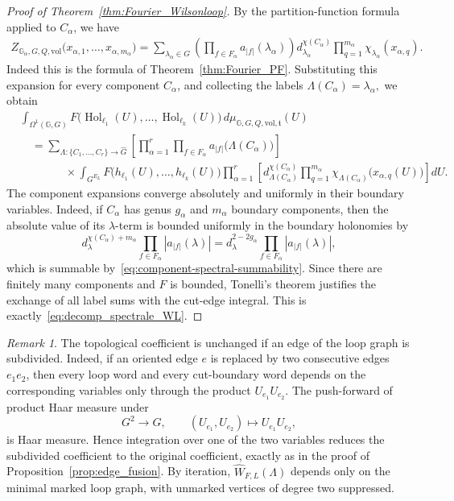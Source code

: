 \documentclass[11pt,a4paper,reqno]{article}
\theoremstyle{definition}
\theoremstyle{remark}
\newtheorem{remark}[theorem]{Remark}
\begin{document}
\begin{proof}[Proof of Theorem~\ref{thm:Fourier_Wilsonloop}]
By the partition-function formula applied to $C_\alpha$, we have
\[
\begin{aligned}
Z_{\mathbb G_\alpha,G,Q,\mathrm{vol}}
 \bigl(x_{\alpha,1},\ldots,x_{\alpha,m_\alpha}\bigr)
=
\sum_{\lambda_\alpha\in\widehat G}
 \left(
 \prod_{f\in F_\alpha}
 a_{|f|}(\lambda_\alpha)
 \right)
 d_{\lambda_\alpha}^{\chi(C_\alpha)}
 \prod_{q=1}^{m_\alpha}
 \chi_{\lambda_\alpha}(x_{\alpha,q}).
\end{aligned}
\]
Indeed this is the formula of Theorem~\ref{thm:Fourier_PF}. Substituting this expansion for every component $C_\alpha$, and collecting the labels $\Lambda(C_\alpha)=\lambda_\alpha,$ we obtain
\[
\begin{aligned}
&\int_{\Omega^1(\mathbb G,G)}
 F\bigl(
 \operatorname{Hol}_{\ell_1}(U),\ldots,
 \operatorname{Hol}_{\ell_k}(U)
 \bigr)\,
 d\mu_{\mathbb G,G,Q,\mathrm{vol},\mathfrak t}(U) \\
&\quad =
\sum_{\Lambda:\{C_1,\ldots,C_r\}\to\widehat G}
 \left[
 \prod_{\alpha=1}^r
 \prod_{f\in F_\alpha}
 a_{|f|}\bigl(\Lambda(C_\alpha)\bigr)
 \right]   \\
&\qquad\qquad \times
 \int_{G^{E_L}}
 F\bigl(h_{\ell_1}(U),\ldots,h_{\ell_k}(U)\bigr)
 \prod_{\alpha=1}^r
 \left[
 d_{\Lambda(C_\alpha)}^{\chi(C_\alpha)}
 \prod_{q=1}^{m_\alpha}
 \chi_{\Lambda(C_\alpha)}
 \bigl(x_{\alpha,q}(U)\bigr)
 \right]
 dU .
\end{aligned}
\]
The component expansions converge absolutely and uniformly in their
boundary variables. Indeed, if $C_\alpha$ has genus $g_\alpha$ and
$m_\alpha$ boundary components, then the absolute value of its
$\lambda$-term is bounded uniformly in the boundary holonomies by
\[
 d_\lambda^{\chi(C_\alpha)+m_\alpha}
 \prod_{f\in F_\alpha}|a_{|f|}(\lambda)|
 =d_\lambda^{2-2g_\alpha}
 \prod_{f\in F_\alpha}|a_{|f|}(\lambda)|,
\]
which is summable by~\eqref{eq:component-spectral-summability}. Since
there are finitely many components and $F$ is bounded, Tonelli's
theorem justifies the exchange of all label sums with the cut-edge
integral. This is exactly~\eqref{eq:decomp_spectrale_WL}.
\end{proof}

\begin{remark}\label{rem:topological-coefficient-subdivision}
The topological coefficient is unchanged if an edge of the loop graph is subdivided. Indeed, if an oriented edge $e$ is replaced by two consecutive edges $e_1e_2$, then every loop word and every cut-boundary word depends on the corresponding variables only through the product $U_{e_1}U_{e_2}$. The push-forward of product Haar measure under
\[
 G^2\longrightarrow G,
 \qquad
 (U_{e_1},U_{e_2})\longmapsto U_{e_1}U_{e_2},
\]
is Haar measure. Hence integration over one of the two variables reduces the subdivided coefficient to the original coefficient, exactly as in the proof of Proposition~\ref{prop:edge_fusion}. By iteration, $\widehat W_{F,L}(\Lambda)$ depends only on the minimal marked loop graph, with unmarked vertices of degree two suppressed.
\end{remark}
\end{document}
